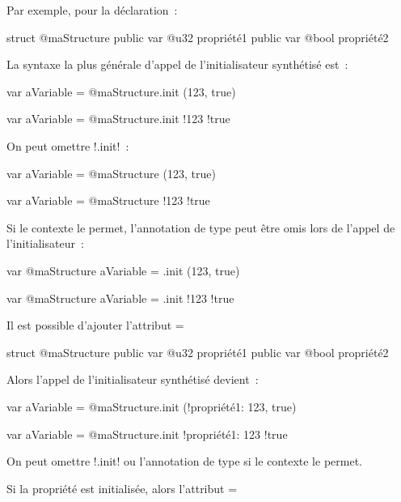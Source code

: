 Par exemple, pour la déclaration~:
\begin{galgas4}
struct @maStructure {
  public var @u32 propriété1
  public var @bool propriété2
}
\end{galgas4}

La syntaxe la plus générale d'appel de l'initialisateur synthétisé est~:
\begin{galgas4}
var aVariable = @maStructure.init (123, true)
\end{galgas4}
\begin{galgas4}
var aVariable = @maStructure.init {!123 !true}
\end{galgas4}

On peut omettre \ggsq!.init!~:
\begin{galgas4}
var aVariable = @maStructure (123, true)
\end{galgas4}
\begin{galgas4}
var aVariable = @maStructure {!123 !true}
\end{galgas4}


Si le contexte le permet, l'annotation de type peut être omis lors de l'appel de l'initialisateur~:
\begin{galgas4}
var @maStructure aVariable = .init (123, true)
\end{galgas4}
\begin{galgas4}
var @maStructure aVariable = .init {!123 !true}
\end{galgas4}


Il est possible d'ajouter l'attribut \ggsq=%
\begin{galgas4}
struct @maStructure {
  public var @u32 propriété1 %
  public var @bool propriété2
}
\end{galgas4}

Alors l'appel de l'initialisateur synthétisé devient~:
\begin{galgas4}
var aVariable = @maStructure.init (!propriété1: 123, true)
\end{galgas4}
\begin{galgas4}
var aVariable = @maStructure.init {!propriété1: 123 !true}
\end{galgas4}

On peut omettre \ggsq!.init! ou l'annotation de type si le contexte le permet.

Si la propriété est initialisée, alors l'attribut \ggsq=%



